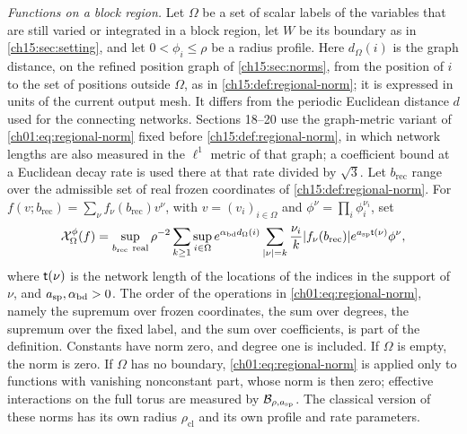\begin{definition}
\emph{Functions on a block region.} Let $\Omega$ be a set of scalar labels of the variables that are still varied or integrated in a block region, let $W$ be its boundary as in \cref{ch15:sec:setting}, and let $0<\phi_i\le\rho$ be a radius profile. Here $d_\Omega(i)$ is the graph distance, on the refined position graph of \cref{ch15:sec:norms}, from the position of $i$ to the set of positions outside $\Omega$, as in \cref{ch15:def:regional-norm}; it is expressed in units of the current output mesh. It differs from the periodic Euclidean distance $d$ used for the connecting networks. Sections 18--20 use the graph-metric variant of \eqref{ch01:eq:regional-norm} fixed before \cref{ch15:def:regional-norm}, in which network lengths are also measured in the $\ell^1$ metric of that graph; a coefficient bound at a Euclidean decay rate is used there at that rate divided by $\sqrt3$. Let $b_{\mathrm{rec}}$ range over the admissible set of real frozen coordinates of \cref{ch15:def:regional-norm}. For $f(v;b_{\mathrm{rec}})=\sum_\nu f_\nu(b_{\mathrm{rec}})v^\nu$, with $v=(v_i)_{i\in\Omega}$ and $\phi^\nu=\prod_i\phi_i^{\nu_i}$, set
\begin{equation}\label{ch01:eq:regional-norm}
 \mathcal X_{\Omega}^{\phi}(f)=
 \sup_{b_{\mathrm{rec}}\ \mathrm{real}}\rho^{-2}
 \sum_{k\ge1}\sup_{i\in\Omega}e^{\alpha_{\mathrm{bd}} d_\Omega(i)}
 \sum_{\lvert \nu\rvert=k}\frac{\nu_i}{k}\lvert f_\nu(b_{\mathrm{rec}})\rvert
                       e^{a_{\mathrm{sp}}\mathsf t(\nu)}\phi^\nu,
\end{equation}
where $\mathsf t(\nu)$ is the network length of the locations of the indices in the support of $\nu$, and $a_{\mathrm{sp}},\alpha_{\mathrm{bd}}>0$. The order of the operations in \eqref{ch01:eq:regional-norm}, namely the supremum over frozen coordinates, the sum over degrees, the supremum over the fixed label, and the sum over coefficients, is part of the definition. Constants have norm zero, and degree one is included. If $\Omega$ is empty, the norm is zero. If $\Omega$ has no boundary, \eqref{ch01:eq:regional-norm} is applied only to functions with vanishing nonconstant part, whose norm is then zero; effective interactions on the full torus are measured by $\mathcal B_{\rho,a_{\mathrm{sp}}}$. The classical version of these norms has its own radius $\rho_{\mathrm{cl}}$ and its own profile and rate parameters.
\end{definition}

